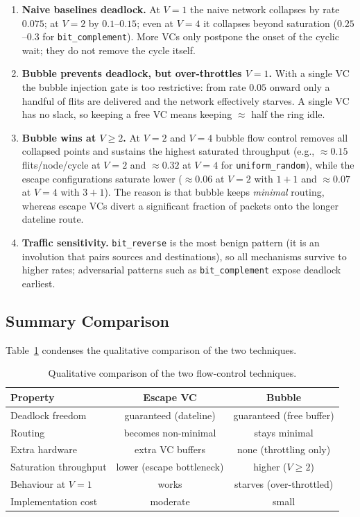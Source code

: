 \documentclass[11pt,a4paper]{article}
\begin{document}
\begin{enumerate}[itemsep=1pt, topsep=2pt]
  \item \textbf{Naive baselines deadlock.} At $V=1$ the naive network collapses
        by rate $0.075$; at $V=2$ by $0.1$--$0.15$; even at $V=4$ it collapses
        beyond saturation ($0.25$--$0.3$ for \texttt{bit\_complement}).  More
        VCs only postpone the onset of the cyclic wait; they do not remove the
        cycle itself.
  \item \textbf{Bubble prevents deadlock, but over-throttles $V=1$.} With a
        single VC the bubble injection gate is too restrictive: from rate
        $0.05$ onward only a handful of flits are delivered and the network
        effectively starves.  A single VC has no slack, so keeping a free VC
        means keeping $\approx$ half the ring idle.
  \item \textbf{Bubble wins at $V \ge 2$.} At $V=2$ and $V=4$ bubble flow
        control removes all collapsed points and sustains the highest
        saturated throughput (e.g., $\approx 0.15$ flits/node/cycle at $V=2$
        and $\approx 0.32$ at $V=4$ for \texttt{uniform\_random}), while the
        escape configurations saturate lower ($\approx 0.06$ at $V=2$ with
        $1+1$ and $\approx 0.07$ at $V=4$ with $3+1$).  The reason is that
        bubble keeps \emph{minimal} routing, whereas escape VCs divert a
        significant fraction of packets onto the longer dateline route.
  \item \textbf{Traffic sensitivity.} \texttt{bit\_reverse} is the most
        benign pattern (it is an involution that pairs sources and
        destinations), so all mechanisms survive to higher rates; adversarial
        patterns such as \texttt{bit\_complement} expose deadlock earliest.
  \end{enumerate}

\subsection{Summary Comparison}
\label{sec:eval:compare}
Table~\ref{tab:compare} condenses the qualitative comparison of the two
techniques.

\begin{table}[H]
  \centering
  \caption{Qualitative comparison of the two flow-control techniques.}
  \label{tab:compare}
  \small
  \begin{tabular}{@{}lcc@{}}
    \toprule
    Property & Escape VC & Bubble \\
    \midrule
    Deadlock freedom & guaranteed (dateline) & guaranteed (free buffer) \\
    Routing & becomes non-minimal & stays minimal \\
    Extra hardware & extra VC buffers & none (throttling only) \\
    Saturation throughput & lower (escape bottleneck) & higher ($V\ge2$) \\
    Behaviour at $V=1$ & works & starves (over-throttled) \\
    Implementation cost & moderate & small \\
    \bottomrule
  \end{tabular}
\end{table}
\end{document}
